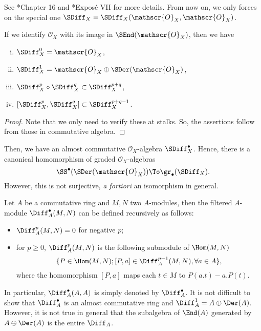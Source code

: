 See \cite{EGA4}*{Chapter 16} and \cite{SGA3}*{Expos\'{e} VII} for more details. 
From now on, we only forces on the special one  
$\SDiff_X=\SDiff_X(\mathscr{O}_X,\mathscr{O}_X)$.

\begin{prop}
If we identify $\mathscr{O}_X$ with its image in $\SEnd(\mathscr{O}_X)$, 
then we have
\begin{enumerate}[(i)]
\item $\SDiff_X^0=\mathscr{O}_X$,
\item $\SDiff_X^1=\mathscr{O}_X\oplus\SDer(\mathscr{O}_X)$,
\item $\SDiff_X^p\circ\SDiff_X^q\subset\SDiff_X^{p+q}$,
\item $[\SDiff_X^p,\SDiff_X^q]\subset \SDiff_X^{p+q-1}$.
\end{enumerate}
\end{prop}
\begin{proof}
Note that we only need to verify these at stalks. 
So, the assertions follow from those in commutative algebra.
\end{proof}

Then, we have an almost commutative $\mathscr{O}_X$-algebra $\SDiff_X^\bullet$. 
Hence, there is a canonical homomorphism of graded $\mathscr{O}_X$-algebras 
\begin{equation}\label{eq:sym(Der)_to_Diff}
\SS^\bullet(\SDer(\mathscr{O}_X))\To\gr_\bullet(\SDiff_X).
\end{equation}
However, this is not surjective, \emph{a fortiori} an isomorphism in general. 


\begin{Rem}
Let $A$ be a commutative ring and $M,N$ two $A$-modules, 
then the filtered $A$-module $\Diff_A^\bullet(M,N)$ 
can be defined recursively as follows: 
\begin{itemize}
\item $\Diff_A^p(M,N)=0$ for negative $p$;
\item for $p\ge0$, $\Diff_A^p(M,N)$ is the following submodule of $\Hom(M,N)$
\[
\{P\in\Hom(M,N);
[P,a]\in\Diff_A^{p-1}(M,N),
\forall a\in A\},
\]
where the homomorphism $[P,a]$ maps each $t\in M$ to $P(a.t)-a.P(t)$. 
\end{itemize}
In particular, $\Diff_A^\bullet(A,A)$ is simply denoted by $\Diff_A^\bullet$.  
It is not difficult to show that $\Diff_A^\bullet$ is an almost commutative ring 
and $\Diff_A^1=A\oplus\Der(A)$. 
However, 
it is not true in general that 
the subalgebra of $\End(A)$ generated by $A\oplus\Der(A)$ 
is the entire $\Diff_A$. 
\end{Rem}

